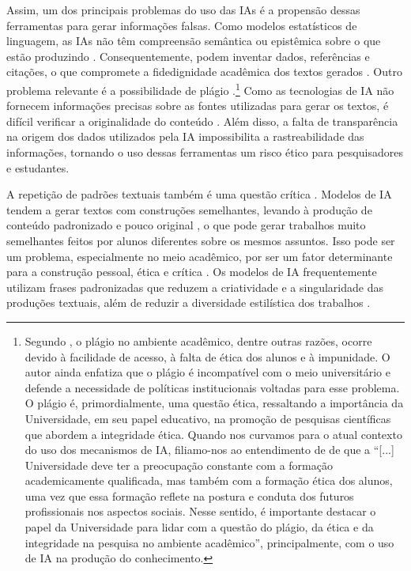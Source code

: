 \documentclass[portuguese]{textolivre}
\begin{document}
Assim, um dos principais problemas do uso das IAs é a propensão dessas ferramentas para gerar informações falsas. Como modelos estatísticos de linguagem, as IAs não têm compreensão semântica ou epistêmica sobre o que estão produzindo \cite{rodrigues2023}. Consequentemente, podem inventar dados, referências e citações, o que compromete a fidedignidade acadêmica dos textos gerados \cite{moraes2013}. Outro problema relevante é a possibilidade de plágio \cite{silveira2021, moraes2013}.\footnote{Segundo \textcite{simoes2012}, o plágio no ambiente acadêmico, dentre outras razões, ocorre devido à facilidade de acesso, à falta de ética dos alunos e à impunidade. O autor ainda enfatiza que o plágio é incompatível com o meio universitário e defende a necessidade de políticas institucionais voltadas para esse problema. O plágio é, primordialmente, uma questão ética, ressaltando a importância da Universidade, em seu papel educativo, na promoção de pesquisas científicas que abordem a integridade ética. Quando nos curvamos para o atual contexto do uso dos mecanismos de IA, filiamo-nos ao entendimento de \textcite[p. 7-8]{silveira2021} de que a ``[...] Universidade deve ter a preocupação constante com a formação academicamente qualificada, mas também com a formação ética dos alunos, uma vez que essa formação reflete na postura e conduta dos futuros profissionais nos aspectos sociais. Nesse sentido, é importante destacar o papel da Universidade para lidar com a questão do plágio, da ética e da integridade na pesquisa no ambiente acadêmico'', principalmente, com o uso de IA na produção do conhecimento.} Como as tecnologias de IA não fornecem informações precisas sobre as fontes utilizadas para gerar os textos, é difícil verificar a originalidade do conteúdo \cite{moraes2013}. Além disso, a falta de transparência na origem dos dados utilizados pela IA impossibilita a rastreabilidade das informações, tornando o uso dessas ferramentas um risco ético para pesquisadores e estudantes.

A repetição de padrões textuais também é uma questão crítica \cite{rodrigues2023}. Modelos de IA tendem a gerar textos com construções semelhantes, levando à produção de conteúdo padronizado e pouco original \cite{levshina2024,Gray2024ChatGPTContamination}, o que pode gerar trabalhos muito semelhantes feitos por alunos diferentes sobre os mesmos assuntos. Isso pode ser um problema, especialmente no meio acadêmico, por ser um fator determinante para a construção pessoal, ética e crítica \cite{carvalho2021}. Os modelos de IA frequentemente utilizam frases padronizadas que reduzem a criatividade e a singularidade das produções textuais, além de reduzir a diversidade estilística dos trabalhos \cite{rodrigues2023, carvalho2021}.
\end{document}
